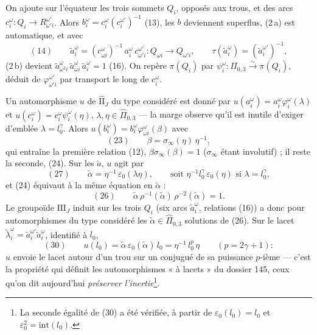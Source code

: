 \documentclass[11pt,a4paper]{article}
\begin{document}
On ajoute sur l'équateur les trois sommets $Q_i$, opposés aux trous, et des
arcs $c_i^{\omega} : Q_i \to R^{\omega'}_{\omega' i}$. Alors $b_i^{\omega} =
c_i^{\omega}(c_i^{\omega'})^{-1}$ (13), les $b$ deviennent superflus, (2\,a)
est automatique, et avec
\[
(14)\qquad \tilde a_i^{\omega} = (c^{\omega}_{\omega i})^{-1}\, a_i^{\omega}\, c^{\omega'}_{\omega' i} : Q_{\omega i} \to Q_{\omega' i}, \qquad \tau(\tilde a_i^{\omega}) = (\tilde a_i^{\omega'})^{-1},
\]
(2\,b) devient $\tilde a^{\omega}_{\omega^2 i}\, \tilde a^{\omega}_{\omega i}\,
\tilde a_i^{\omega} = 1$ (16). On repère $\pi(Q_i)$ par $\psi_i^{\omega} :
\Pi_{0,3} \xrightarrow{\sim} \pi(Q_i)$, déduit de
$\varphi^{\omega'}_{\omega' i}$ par transport le long de $c_i^{\omega}$.

Un automorphisme $u$ de $\widehat{\mathrm{II}}_J$ du type considéré est donné
par $u(a_i^{\omega}) = a_i^{\omega}\varphi_i^{\omega}(\lambda)$ et
$u(c_i^{\omega}) = c_i^{\omega}\psi_i^{\omega}(\eta)$, $\lambda, \eta \in
\widehat\Pi_{0,3}$ — la marge observe qu'il est inutile d'exiger d'emblée
$\lambda = l_0^{\gamma}$. Alors $u(b_i^{\omega}) =
b_i^{\omega}\varphi^{\omega}_{\omega i}(\beta)$ avec
\[
(23)\qquad \beta = \sigma_\infty(\eta)\, \eta^{-1},
\]
qui entraîne la première relation (12), $\beta\sigma_\infty(\beta) = 1$
($\sigma_\infty$ étant involutif) ; il reste la seconde, (24). Sur les
$\tilde a$, $u$ agit par
\[
(27)\qquad \tilde\alpha = \eta^{-1}\, \varepsilon_0(\lambda\eta), \qquad \text{soit } \eta^{-1} l_0^{\gamma}\, \varepsilon_0(\eta) \text{ si } \lambda = l_0^{\gamma},
\]
et (24) équivaut à la même équation en $\tilde\alpha$ :
\[
(26)\qquad \tilde\alpha\, \rho^{-1}(\tilde\alpha)\, \rho^{-2}(\tilde\alpha) = 1 .
\]
Le groupoïde $\mathrm{III}_J$ induit sur les trois $Q_i$ (six arcs
$\tilde a_i^{\omega}$, relations (16)) a donc pour automorphismes du type
considéré les $\tilde\alpha \in \widehat\Pi_{0,3}$ solutions de (26). Sur le
lacet $\tilde\lambda_i^{\omega} = \tilde a_i^{\omega'}\tilde a_i^{\omega}$,
identifié à $l_0$,
\[
(30)\qquad u(l_0) = \tilde\alpha\, \varepsilon_0(\tilde\alpha)\, l_0 = \eta^{-1}\, l_0^{p}\, \eta \qquad (p = 2\gamma + 1) :
\]
$u$ envoie le lacet autour d'un trou sur un conjugué de sa puissance $p$-ième
— c'est la propriété qui définit les automorphismes « à lacets » du dossier
145, ceux qu'on dit aujourd'hui \emph{préserver l'inertie}\footnote{La
seconde égalité de (30) a été vérifiée, à partir de $\varepsilon_0(l_0) = l_0$
et $\varepsilon_0^2 = \mathrm{int}(l_0)$.}.
\end{document}
